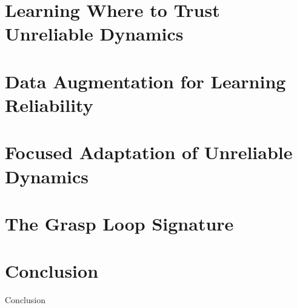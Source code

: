 \documentclass[reqno,12pt,oneside]{report} %
\begin{document}
\chapter{Learning Where to Trust Unreliable Dynamics}
\label{chap:SciRob}

 
\chapter{Data Augmentation for Learning Reliability}
\label{chap:DataAugmentation}

 
\chapter{Focused Adaptation of Unreliable Dynamics}
\label{chap:FOCUS}

 
\chapter{The Grasp Loop Signature}
\label{chap:GraspLoop}


\chapter{Conclusion}
\label{chap:conclusion}

Conclusion


\startbibliography
 \begin{singlespace} %
 \end{singlespace}

%
\end{document}

